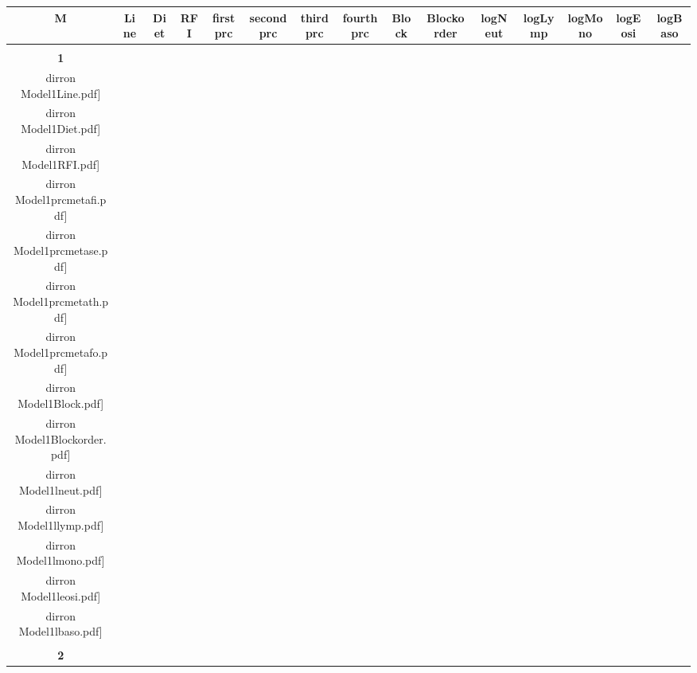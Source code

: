 \documentclass[landscape]{article}
\def \dirron {U:/R/RA/Data/RFI-newdata/resultsingle/Model1.Line.Diet.RFI.prcmetafi.prcmetase.prcmetath.prcmetafo.lneut.llymp.lmono.leosi.lbaso.Block.Blockorder/}
\begin{document}
\begin{table}
\Huge
\centering
\begin{tabular}{ccccccccccccccc}
      {\Huge \textbf{M}} 
      & {\Huge\textbf{ Line}} 
      &{\Huge \textbf{Diet}} 
      & {\Huge \textbf{RFI}}
      &{\Huge\textbf{ firstprc}} 
      &{\Huge \textbf{secondprc}} 
      &{\Huge \textbf{thirdprc} } 
      &{\Huge \textbf{fourthprc} }
      &{\Huge \textbf{Block}} 
      &{\Huge \textbf{Blockorder}}
      &{\Huge \textbf{logNeut}}
      &{\Huge \textbf{logLymp}}
      &{\Huge \textbf{logMono}}
      &{\Huge \textbf{logEosi}}
      &{\Huge \textbf{logBaso}}
      \\[3.5pt]
      \hline
      \\[3.5pt]
      {\Huge \textbf{1}} 
      &\texttt{[image: \\dirron Model1Line.pdf]}
      &\texttt{[image: \\dirron Model1Diet.pdf]}
      &\texttt{[image: \\dirron Model1RFI.pdf]}
      &\texttt{[image: \\dirron Model1prcmetafi.pdf]}
      &\texttt{[image: \\dirron Model1prcmetase.pdf]}
      &\texttt{[image: \\dirron Model1prcmetath.pdf]}
      &\texttt{[image: \\dirron Model1prcmetafo.pdf]}
      &\texttt{[image: \\dirron Model1Block.pdf]}
      &\texttt{[image: \\dirron Model1Blockorder.pdf]}
      &\texttt{[image: \\dirron Model1lneut.pdf]}
      &\texttt{[image: \\dirron Model1llymp.pdf]}
      &\texttt{[image: \\dirron Model1lmono.pdf]}
      &\texttt{[image: \\dirron Model1leosi.pdf]}
      &\texttt{[image: \\dirron Model1lbaso.pdf]}
     \\[3.5pt]
     \hline
     \\[3.5pt]
     {\Huge \textbf{2}} 
      

\end{tabular}
\end{table}
\end{document}
